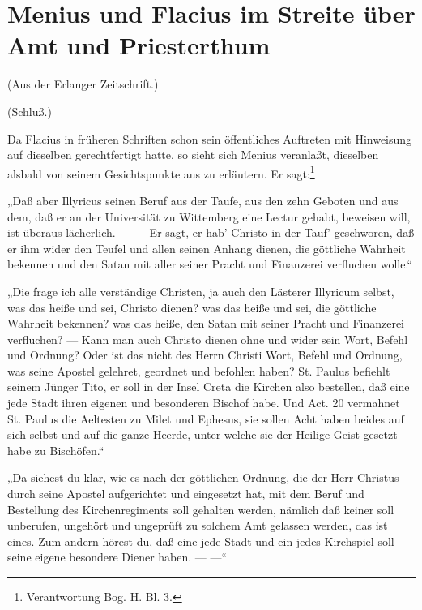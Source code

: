 \chapter[Menius und Flacius]{Menius und Flacius im Streite über Amt und Priesterthum}

\begin{center}
(Aus der Erlanger Zeitschrift.)
\end{center}

\begin{center}
(Schluß.)
\end{center}

Da Flacius in früheren Schriften schon sein öffentliches Auftreten mit Hinweisung auf dieselben gerechtfertigt
hatte, so sieht sich Menius veranlaßt, dieselben alsbald von seinem Gesichtspunkte aus zu erläutern. Er sagt:\footnote{Verantwortung Bog. H. Bl. 3.}

„Daß aber Illyricus seinen Beruf aus der Taufe, aus den zehn Geboten und aus dem, daß er an der Universität zu
Wittemberg eine Lectur gehabt, beweisen will, ist überaus lächerlich. — — Er sagt, er hab’ Christo in der
Tauf’ geschworen, daß er ihm wider den Teufel und allen seinen Anhang dienen, die göttliche Wahrheit bekennen
und den Satan mit aller seiner Pracht und Finanzerei verfluchen wolle.“

„Die frage ich alle verständige Christen, ja auch den Lästerer Illyricum selbst, was das heiße und sei, Christo
dienen? was das heiße und sei, die göttliche Wahrheit bekennen? was das heiße, den Satan mit seiner Pracht und
Finanzerei verfluchen? — Kann man auch Christo dienen ohne und wider sein Wort, Befehl und Ordnung? Oder ist das
nicht des Herrn Christi Wort, Befehl und Ordnung, was seine Apostel gelehret, geordnet und befohlen haben? St. Paulus
befiehlt seinem Jünger Tito, er soll in der Insel Creta die Kirchen also bestellen, daß eine jede Stadt ihren
eigenen und besonderen Bischof habe. Und Act. 20 vermahnet St. Paulus die Aeltesten zu Milet und Ephesus, sie
sollen Acht haben beides auf sich selbst und auf die ganze Heerde, unter welche sie der Heilige Geist gesetzt habe
zu Bischöfen.“

„Da siehest du klar, wie es nach der göttlichen Ordnung, die der Herr Christus durch seine Apostel aufgerichtet
und eingesetzt hat, mit dem Beruf und Bestellung des Kirchenregiments soll gehalten werden, nämlich daß keiner
soll unberufen, ungehört und ungeprüft zu solchem Amt gelassen werden, das ist eines. Zum andern hörest du,
daß eine jede Stadt und ein jedes Kirchspiel soll seine eigene besondere Diener haben. — —“

